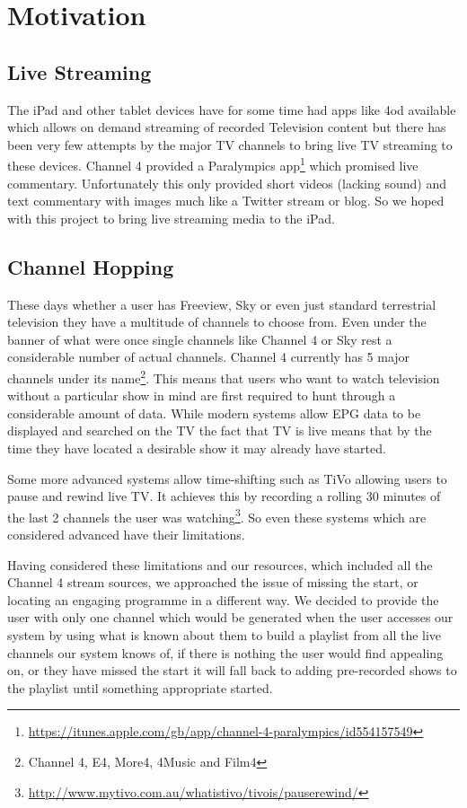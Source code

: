 \section{Motivation}

\subsection{Live Streaming}
The iPad and other tablet devices have for some time had apps like 4od available which allows on demand streaming of recorded Television content but there has been very few attempts by the major TV channels to bring live TV streaming to these devices. Channel 4 provided a Paralympics app\footnote{\url{https://itunes.apple.com/gb/app/channel-4-paralympics/id554157549}} which promised live commentary. Unfortunately this only provided short videos (lacking sound) and text commentary with images much like a Twitter stream or blog. So we hoped with this project to bring live streaming media to the iPad.

\subsection{Channel Hopping}
These days whether a user has Freeview, Sky or even just standard terrestrial television they have a multitude of channels to choose from. Even under the banner of what were once single channels like Channel 4 or Sky rest a considerable number of actual channels. Channel 4 currently has 5 major channels under its name\footnote{Channel 4, E4, More4, 4Music and Film4}. This means that users who want to watch television without a particular show in mind are first required to hunt through a considerable amount of data. While modern systems allow EPG data to be displayed and searched on the TV the fact that TV is live means that by the time they have located a desirable show it may already have started.

Some more advanced systems allow time-shifting such as TiVo allowing users to pause and rewind live TV. It achieves this by recording a rolling 30 minutes of the last 2 channels the user was watching\footnote{\url{http://www.mytivo.com.au/whatistivo/tivois/pauserewind/}}. So even these systems which are considered advanced have their limitations.

Having considered these limitations and our resources, which included all the Channel 4 stream sources, we approached the issue of missing the start, or locating an engaging programme in a different way. We decided to provide the user with only one channel which would be generated when the user accesses our system by using what is known about them to build a playlist from all the live channels our system knows of, if there is nothing the user would find appealing on, or they have missed the start it will fall back to adding pre-recorded shows to the playlist until something appropriate started.

